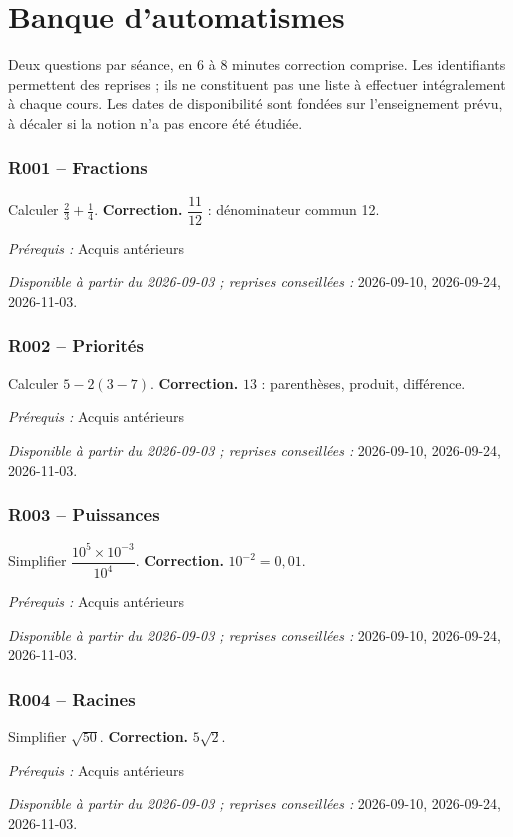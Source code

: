 \chapter{Banque d’automatismes}\label{AUTO}
Deux questions par séance, en 6 à 8 minutes correction comprise. Les identifiants permettent des reprises ; ils ne constituent pas une liste à effectuer intégralement à chaque cours. Les dates de disponibilité sont fondées sur l’enseignement prévu, à décaler si la notion n’a pas encore été étudiée.
\subsection*{R001 -- Fractions}\label{R001}
Calculer $\frac23+\frac14$.
\ifprof\textbf{Correction.} $\dfrac{11}{12}$ : dénominateur commun 12.\par\textit{Prérequis :} Acquis antérieurs\par\textit{Disponible à partir du 2026-09-03 ; reprises conseillées :} 2026-09-10, 2026-09-24, 2026-11-03.\fi
{}\subsection*{R002 -- Priorités}\label{R002}
Calculer $5-2(3-7)$.
\ifprof\textbf{Correction.} $13$ : parenthèses, produit, différence.\par\textit{Prérequis :} Acquis antérieurs\par\textit{Disponible à partir du 2026-09-03 ; reprises conseillées :} 2026-09-10, 2026-09-24, 2026-11-03.\fi
{}\subsection*{R003 -- Puissances}\label{R003}
Simplifier $\dfrac{10^5\times 10^{-3}}{10^4}$.
\ifprof\textbf{Correction.} $10^{-2}=0{,}01$.\par\textit{Prérequis :} Acquis antérieurs\par\textit{Disponible à partir du 2026-09-03 ; reprises conseillées :} 2026-09-10, 2026-09-24, 2026-11-03.\fi
{}\subsection*{R004 -- Racines}\label{R004}
Simplifier $\sqrt{50}$.
\ifprof\textbf{Correction.} $5\sqrt2$.\par\textit{Prérequis :} Acquis antérieurs\par\textit{Disponible à partir du 2026-09-03 ; reprises conseillées :} 2026-09-10, 2026-09-24, 2026-11-03.\fi
